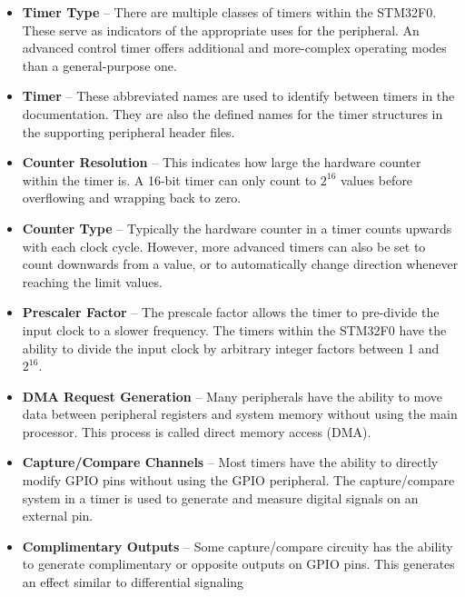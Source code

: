 \documentclass[11pt,fleqn]{book} %
\begin{document}
        \begin{itemize}
            \item \textbf{Timer Type} -- There are multiple classes of timers within the STM32F0. These serve as indicators of the appropriate uses for the peripheral. An advanced control timer offers additional and more-complex operating modes than a general-purpose one. 
            \item \textbf{Timer} -- These abbreviated names are used to identify between timers in the documentation. They are also the defined names for the timer structures in the supporting peripheral header files. 
            \item \textbf{Counter Resolution} -- This indicates how large the hardware counter within the timer is. A 16-bit timer can only count to $2^{16}$ values before overflowing and wrapping back to zero. 
            \item \textbf{Counter Type} -- Typically the hardware counter in a timer counts upwards with each clock cycle. However, more advanced timers can also be set to count downwards from a value, or to automatically change direction whenever reaching the limit values. 
            \item \textbf{Prescaler Factor} -- The prescale factor allows the timer to pre-divide the input clock to a slower frequency. The timers within the STM32F0 have the ability to divide the input clock by arbitrary integer factors between 1 and $2^{16}$.
            \item \textbf{DMA Request Generation} -- Many peripherals have the ability to move data between peripheral registers and system memory without using the main processor. This process is called direct memory access (DMA).
            \item \textbf{Capture/Compare Channels} -- Most timers have the ability to directly modify GPIO pins without using the GPIO peripheral. The capture/compare system in a timer is used to generate and measure digital signals on an external pin. 
            \item \textbf{Complimentary Outputs} -- Some capture/compare circuity has the ability to generate complimentary or opposite outputs on GPIO pins. This generates an effect similar to differential signaling 
        \end{itemize}
        
        
%    
\end{document}
